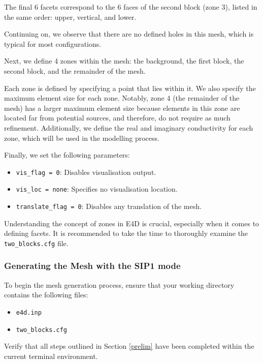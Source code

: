 \documentclass[a4paper,12pt]{article}
\begin{document}
The final 6 facets correspond to the 6 faces of the second block (zone 3),
listed in the same order: upper, vertical, and lower.

Continuing on, we observe that there are no defined holes in this mesh, which
is typical for most configurations.

Next, we define 4 zones within the mesh: the background, the first block, the
second block, and the remainder of the mesh.

Each zone is defined by specifying a point that lies within it. We also specify
the maximum element size for each zone. Notably, zone 4 (the remainder of the
mesh) has a larger maximum element size because elements in this zone are
located far from potential sources, and therefore, do not require as much
refinement. Additionally, we define the real and imaginary conductivity for
each zone, which will be used in the modelling process.

Finally, we set the following parameters:

\begin{itemize}
    \item \texttt{vis\_flag = 0}: Disables visualisation output.
    \item \texttt{vis\_loc = none}: Specifies no visualisation location.
    \item \texttt{translate\_flag = 0}: Disables any translation of the mesh.
\end{itemize}

Understanding the concept of zones in E4D is crucial, especially when it comes
to defining facets. It is recommended to take the time to thoroughly examine
the \texttt{two\_blocks.cfg} file.

\subsubsection{Generating the Mesh with the SIP1 mode}

To begin the mesh generation process, ensure that your working directory
contains the following files:

\begin{itemize}
    \item \texttt{e4d.inp}
    \item \texttt{two\_blocks.cfg}
\end{itemize}

Verify that all steps outlined in Section \ref{prelim} have been completed
within the current terminal environment.
\end{document}
